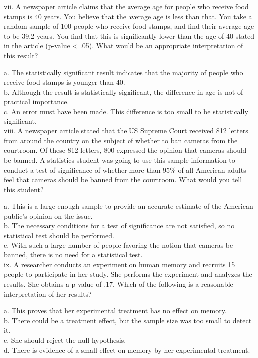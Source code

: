 \documentclass[11pt]{isuthesis}\usepackage[]{graphicx}\usepackage[]{color}
\begin{document}
\begin{appendices}
vii. A newspaper article claims that the average age for people who receive food stamps is 40 years. You believe that the average age is less than that. You take a random sample of 100 people who receive food stamps, and find their average age to be 39.2 years. You find that this is significantly lower than the age of 40 stated in the article (p-value < .05). What would be an appropriate interpretation of this result?

a. The statistically significant result indicates that the majority of people who receive food stamps is younger than 40.\\
b. Although the result is statistically significant, the difference in age is not of practical importance.\\
c. An error must have been made. This difference is too small to be statistically significant.\\

viii. A newspaper article stated that the US Supreme Court received 812 letters from around the country on the subject of whether to ban cameras from the courtroom. Of these 812 letters, 800 expressed the opinion that cameras should be banned. A statistics student was going to use this sample information to conduct a test of significance of whether more than 95\% of all American adults feel that cameras should be banned from the courtroom. What would you tell this student?

a. This is a large enough sample to provide an accurate estimate of the American public's opinion on the issue.\\
b. The necessary conditions for a test of significance are not satisfied, so no statistical test should be performed.\\
c. With such a large number of people favoring the notion that cameras be banned, there is no need for a statistical test.\\

ix. A researcher conducts an experiment on human memory and recruits 15 people to participate in her study. She performs the experiment and analyzes the results. She obtains a p-value of .17. Which of the following is a reasonable interpretation of her results?

a. This proves that her experimental treatment has no effect on memory.\\
b. There could be a treatment effect, but the sample size was too small to detect it.\\
c. She should reject the null hypothesis.\\
d. There is evidence of a small effect on memory by her experimental treatment.\\


\end{appendices}
\end{document}
